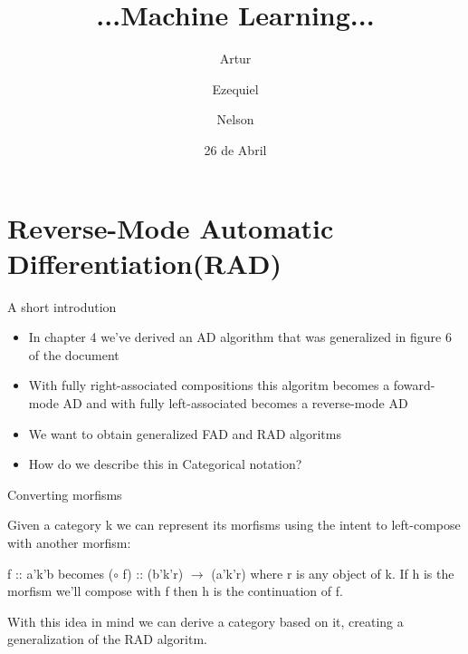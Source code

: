 \documentclass{beamer}
\title
{...Machine Learning...}
\author[Artur, Ezequiel, Nelson] 
{Artur \and Ezequiel \and Nelson}
\institute
{Universidade do Minho}
\date
{26 de Abril}
\begin{document}
\section{Reverse-Mode Automatic Differentiation(RAD)}


\begin{frame}{A short introdution}

\begin{itemize}
    \item<1-> In chapter 4 we've derived an AD algorithm that was generalized in figure 6 of the document
    \item<2-> With fully right-associated compositions this algoritm becomes a foward-mode AD and with fully left-associated becomes a reverse-mode AD
    \item<3-> We want to obtain generalized FAD and RAD algoritms 
    \item<4-> How do we describe this in Categorical notation?
\end{itemize}

\end{frame}




\begin{frame}{Converting morfisms}

Given a category k we can represent its morfisms using the intent to left-compose with another morfism:

f :: a'k'b becomes ($\circ$ f) :: (b'k'r) \ensuremath{\rightarrow } (a'k'r) where r is any object of k.
If h is the morfism we'll compose with f then h is the continuation of f.

With this idea in mind we can derive a category based on it, creating a generalization of the RAD algoritm.

\end{frame}
\end{document}
